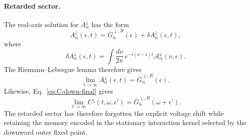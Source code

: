 \documentclass[
 reprint,
 superscriptaddress,
 amsmath,amssymb,
 aps,prb,
 longbibliography,
 floatfix
]{revtex4-2}
\begin{document}
\paragraph{Retarded sector.}
The real-axis solution for \(A_\alpha^\downarrow\) has the form
\begin{equation}
A_\alpha^\downarrow(\epsilon,t)
=
\overline G_{\mathrm u}^{\downarrow,R}(\epsilon)
+
\delta A_\alpha^\downarrow(\epsilon,t),
\label{eq:down-asymp-A-decomp}
\end{equation}
where
\begin{equation*}
\delta A_\alpha^\downarrow(\epsilon,t)
=
\int\frac{d\nu}{2\pi}\,
e^{-i(\nu-\epsilon)t}
\mathcal A_\alpha^\downarrow(\nu,\epsilon).
\end{equation*}
The Riemann--Lebesgue lemma therefore gives
\begin{equation}
\lim_{t\to\infty}A_\alpha^\downarrow(\epsilon,t)
=
\overline G_{\mathrm u}^{\downarrow,R}(\epsilon).
\label{eq:down-asymp-A}
\end{equation}
Likewise, Eq.~\eqref{eq:C-down-final} gives
\begin{equation}
\lim_{t\to\infty}C^\downarrow(t,\omega,\epsilon')
=
\overline G_{\mathrm u}^{\downarrow,R}(\omega+\epsilon').
\label{eq:down-asymp-C}
\end{equation}
The retarded sector has therefore forgotten the explicit voltage shift while retaining the memory encoded in the stationary interaction kernel selected by the downward outer fixed point.
\end{document}
